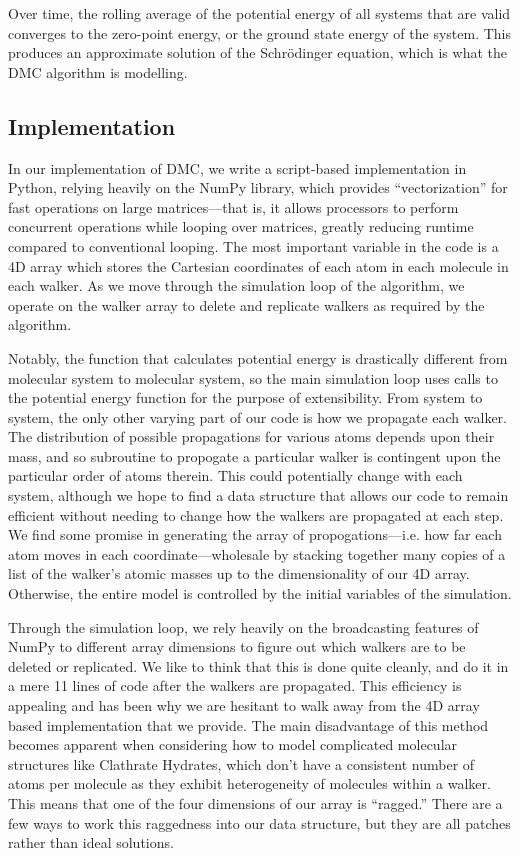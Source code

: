 \documentclass[journal=jacsat,manuscript=article]{achemso}
\begin{document}
Over time, the rolling average of the potential energy of all systems that are valid converges to the zero-point energy, or the ground state energy of the system. This produces an approximate solution of the Schr\"odinger equation, which is what the DMC algorithm is modelling.

\subsection{Implementation}
In our implementation of DMC, we write a script-based implementation in Python, relying heavily on the NumPy library, which provides ``vectorization'' for fast operations on large matrices---that is, it allows processors to perform concurrent operations while looping over matrices, greatly reducing runtime compared to conventional looping. The most important variable in the code is a 4D array which stores the Cartesian coordinates of each atom in each molecule in each walker. As we move through the simulation loop of the algorithm, we operate on the walker array to delete and replicate walkers as required by the algorithm.

Notably, the function that calculates potential energy is drastically different from molecular system to molecular system, so the main simulation loop uses calls to the potential energy function for the purpose of extensibility. From system to system, the only other varying part of our code is how we propagate each walker. The distribution of possible propagations for various atoms depends upon their mass, and so subroutine to propogate a particular walker is contingent upon the particular order of atoms therein. This could potentially change with each system, although we hope to find a data structure that allows our code to remain efficient without needing to change how the walkers are propagated at each step. We find some promise in generating the array of propogations---i.e. how far each atom moves in each coordinate---wholesale by stacking together many copies of a list of the walker's atomic masses up to the dimensionality of our 4D array. Otherwise, the entire model is controlled by the initial variables of the simulation.

Through the simulation loop, we rely heavily on the broadcasting features of NumPy to different array dimensions to figure out which walkers are to be deleted or replicated. We like to think that this is done quite cleanly, and do it in a mere 11 lines of code after the walkers are propagated. This efficiency is appealing and has been why we are hesitant to walk away from the 4D array based implementation that we provide. The main disadvantage of this method becomes apparent when considering how to model complicated molecular structures like Clathrate Hydrates, which don't have a consistent number of atoms per molecule as they exhibit heterogeneity of molecules within a walker. This means that one of the four dimensions of our array is ``ragged.'' There are a few ways to work this raggedness into our data structure, but they are all patches rather than ideal solutions.
\end{document}
